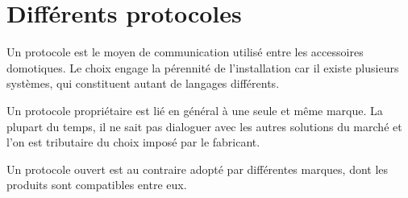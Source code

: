 \documentclass[12pt]{article}
\begin{document}
\section{Différents protocoles}
Un protocole est le moyen de communication utilisé entre les accessoires domotiques. Le choix engage la pérennité de l’installation car il existe plusieurs systèmes, qui constituent autant de langages différents.

Un protocole propriétaire est lié en général à une seule et même marque. La plupart du temps, il ne sait pas dialoguer avec les autres solutions du marché et l’on est tributaire du choix imposé par le fabricant.

Un protocole ouvert est au contraire adopté par différentes marques, dont les produits sont compatibles entre eux.
\newpage


\end{document}
